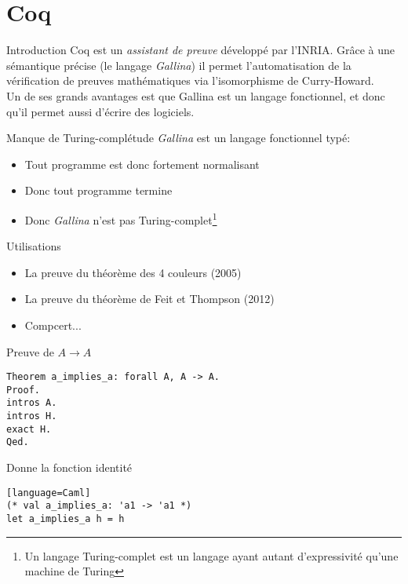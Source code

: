 \documentclass[11pt,a4paper]{beamer}
\theoremstyle{plain}
\theoremstyle{definition}
\theoremstyle{remark}
\begin{document}
\section{Coq}

\begin{frame}{Introduction}
Coq est un \emph{assistant de preuve} développé par l'INRIA. Grâce à une sémantique précise (le langage \emph{Gallina}) il permet l'automatisation de la vérification de preuves mathématiques via l'isomorphisme de Curry-Howard.\\
Un de ses grands avantages est que Gallina est un langage fonctionnel, et donc qu'il permet aussi d'écrire des logiciels.
\end{frame}

\begin{frame}{Manque de Turing-complétude}
\emph{Gallina} est un langage fonctionnel typé:
\begin{itemize}
	\item Tout programme est donc fortement normalisant
	\item Donc tout programme termine
	\item Donc \emph{Gallina} n'est pas Turing-complet\footnote{Un langage Turing-complet est un langage ayant autant d'expressivité qu'une machine de Turing}
\end{itemize}

\end{frame}

\begin{frame}{Utilisations}
	\begin{itemize}
		\item La preuve du théorème des 4 couleurs (2005)
		\item La preuve du théorème de Feit et Thompson (2012)
		\item Compcert...
	\end{itemize}
\end{frame}

\begin{frame}[fragile]{Preuve de $A\rightarrow A$}
\begin{lstlisting}[frame=single]
Theorem a_implies_a: forall A, A -> A.
Proof.
intros A.
intros H.
exact H.
Qed.
\end{lstlisting}

Donne la fonction identité
\begin{lstlisting}[frame=single][language=Caml]
(* val a_implies_a: 'a1 -> 'a1 *)
let a_implies_a h = h
\end{lstlisting}
\end{frame}
\end{document}
